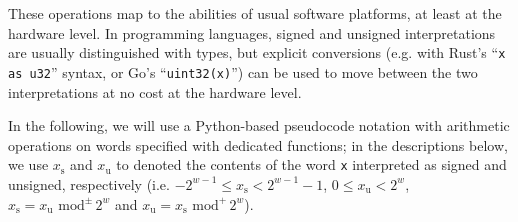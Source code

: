 \documentclass{llncs}
\newcommand{\umod}[2]{#1 \,\,\text{mod}^{+}\, #2}
\newcommand{\smod}[2]{#1 \,\,\text{mod}^{\pm}\, #2}
\begin{document}
These operations map to the abilities of usual software platforms, at
least at the hardware level. In programming languages, signed and
unsigned interpretations are usually distinguished with types, but
explicit conversions (e.g. with Rust's ``\verb+x as u32+'' syntax, or
Go's ``\verb+uint32(x)+'') can be used to move between the two
interpretations at no cost at the hardware level.

In the following, we will use a Python-based pseudocode notation with
arithmetic operations on words specified with dedicated functions; in
the descriptions below, we use $x_\text{s}$ and $x_\text{u}$ to denoted
the contents of the word \verb+x+ interpreted as signed and unsigned,
respectively (i.e. $-2^{w-1} \leq x_\text{s} < 2^{w-1} - 1$,
$0\leq x_\text{u} < 2^w$, $x_\text{s} = \smod{x_\text{u}}{2^w}$
and $x_\text{u} = \umod{x_\text{s}}{2^w}$).

\newcommand{\makecodedesclabel}[1]{\texttt{\small #1}\hfill}
\newenvironment{codedesc}
    {\begin{list}
        {}
        {\setlength{\labelwidth}{10.5em}
         \setlength{\labelsep}{0.5em}
         \setlength{\itemsep}{1ex}
         \setlength{\leftmargin}{11em}
         \setlength{\rightmargin}{0em}
         \let\makelabel=\makecodedesclabel
        }
    }
    {\end{list}}
\end{document}
